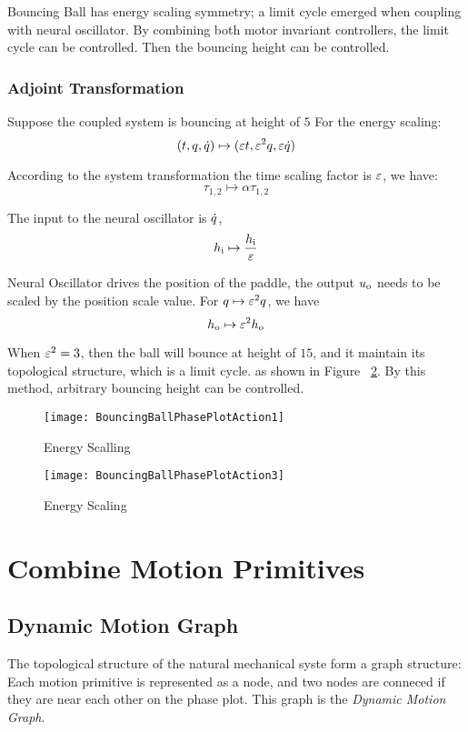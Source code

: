 Bouncing Ball has energy scaling symmetry; a limit cycle emerged when coupling with neural oscillator.
By combining both motor invariant controllers, the limit cycle can be controlled.
Then the bouncing height can be controlled.

\subsubsection*{Adjoint Transformation}
Suppose the coupled system is bouncing at height of $5$
For the energy scaling:
\[
(t,q,\dot{q} ) \mapsto ( \varepsilon t ,\varepsilon^2 q,\varepsilon \dot{q})
\]

According to the system transformation
the time scaling factor is $\varepsilon$, we have:
\[
\tau_{1,2} \mapsto \alpha \tau_{1,2}
\]

The input to the neural oscillator is $\dot{q}$,
\[
h_{\mathrm{i}} \mapsto \frac{h_{\mathrm{i}}}{\varepsilon}
\]
 
Neural Oscillator drives the position of the paddle, the output $u_{\mathrm{o}}$ needs to be scaled by the position scale value.
For $q \mapsto \varepsilon^2q$, we have
\[
 h_{\mathrm{o}} \mapsto \varepsilon^2 h_{\mathrm{o}}
\]

When $\varepsilon^2=3$, then the ball will bounce at height of $15$, and it maintain its topological structure, which is a limit cycle.
as shown in Figure ~\ref{fig:energy3}. 
By this method, arbitrary bouncing height can be controlled.


\begin{figure}[!htbp]
  \begin{center}
   	\texttt{[image: BouncingBallPhasePlotAction1]}
    \caption{Energy Scalling}
    \label{fig:energy1}
  \end{center}
\end{figure} 


\begin{figure}[!htbp]
  \begin{center}
	\texttt{[image: BouncingBallPhasePlotAction3]}
    \caption{Energy Scaling}
    \label{fig:energy3}
  \end{center}
\end{figure}

\section{Combine Motion Primitives}
\label{sec:manyprimitive}

\subsection{Dynamic Motion Graph}
The topological structure of the natural mechanical syste form a graph structure:
Each motion primitive is represented as a node, and two nodes are conneced if they are near each other on the phase plot.
This graph is the \emph{Dynamic Motion Graph}.

